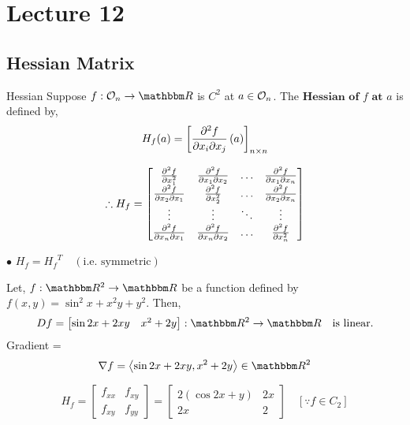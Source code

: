 \documentclass[../Analysis-3]{subfiles}
\begin{document}
\chapter*{Lecture 12} %
\setcounter{chapter}{12} %
\setcounter{section}{0}

\section{Hessian Matrix}

\begin{Def}{Hessian}{}
    Suppose $f : \Op{n} \to \R$ is $C^2$ at $a \in \mathcal{O}_{n} $. The $\textbf{Hessian of $f$ at $a$}$ is defined by, \[ H_f(a) = \left[ \pdv{f}{x_i}{x_j}\left( a \right) \right]_{n \times n} \]
\end{Def}

\[ \therefore H_{f} = \begin{bmatrix}
        \pdv[2]{f}{x_1}   & \pdv{f}{x_1}{x_2} & \ldots & \pdv{f}{x_1}{x_n} \\
        \pdv{f}{x_2}{x_1} & \pdv[2]{f}{x_2}   & \ldots & \pdv{f}{x_2}{x_n} \\
        \vdots            & \vdots            & \ddots & \vdots            \\
        \pdv{f}{x_n}{x_1} & \pdv{f}{x_n}{x_2} & \ldots & \pdv[2]{f}{x_n}
    \end{bmatrix} \]

$\bullet$ $H_f = {H_f}^T \quad (\text{i.e. symmetric})$

\begin{Eg}{}{}
    Let, $f : \R^2 \to \R$ be a function defined by $f(x,y) = \sin^2 x + x^2y + y^2$. Then,
    \[Df = \begin{bmatrix}
            \sin2x + 2xy & x^2 + 2y
        \end{bmatrix} :  \R^2 \to \R \quad \text{is linear.} \]
    Gradient = \[\nabla f = \left\langle \sin2x + 2xy, x^2 + 2y \right\rangle \in \R^2 \]

    \[ H_f = \begin{bmatrix}
            f_{xx} & f_{xy} \\
            f_{xy} & f_{yy}
        \end{bmatrix} = \begin{bmatrix}
            2( \cos2x + y) & 2x \\
            2x             & 2
        \end{bmatrix} \quad [ \because  f \in C_2] \]

\end{Eg}
\end{document}
